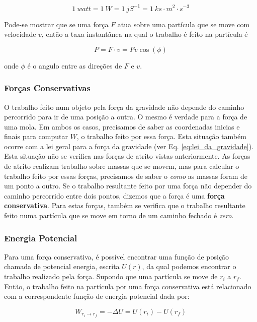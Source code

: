 \begin{equation}
    1\ watt = 1\ W = 1\ jS^{-1}=1\ ks\cdot m^2\cdot s^{-3}
\end{equation}

Pode-se mostrar que se uma força $F$ atua sobre uma partícula que se move com velocidade $v$, então a taxa instantânea na qual o trabalho é feito na partícula é

\begin{equation}
    P=F\cdot v=Fv\cos(\phi)
\end{equation}

onde $\phi$ é o angulo entre as direções de $F$ e $v$.

\subsubsection{Forças Conservativas}
O trabalho feito num objeto pela força da gravidade não depende do caminho percorrido para ir de uma posição a outra. O mesmo é verdade para a força de uma mola. Em ambos os casos, precisamos de saber as coordenadas inicias e finais para computar $W$, o trabalho feito por essa força.
Esta situação também ocorre com a lei geral para a força da gravidade (ver Eq. \ref{eq:lei_da_gravidade}).
Esta situação não se verifica nas forças de atrito vistas anteriormente. As forças de atrito realizam trabalho sobre massas que se movem, mas para calcular o trabalho feito por essas forças, precisamos de saber o \emph{como} as massas foram de um ponto a outro.
Se o trabalho resultante feito por uma força não depender do caminho percorrido entre dois pontos, dizemos que a força é uma \textbf{força conservativa}. Para estas forças, também se verifica que o trabalho resultante feito numa partícula que se move em torno de um caminho fechado é \emph{zero}.

\subsubsection{Energia Potencial}
Para uma força conservativa, é possível encontrar uma função de posição chamada de potencial energia, escrita $U(r)$, da qual podemos encontrar o trabalho realizado pela força.
Supondo que uma partícula se move de $r_i$ a $r_f$. Então, o trabalho feito na partícula por uma força conservativa está relacionado com a correspondente função de energia potencial dada por:

\begin{equation}\label{eq:trabalho-potencial}
    W_{r_i \to r_f}=-\Delta U=U(r_i)-U(r_f)
\end{equation}

